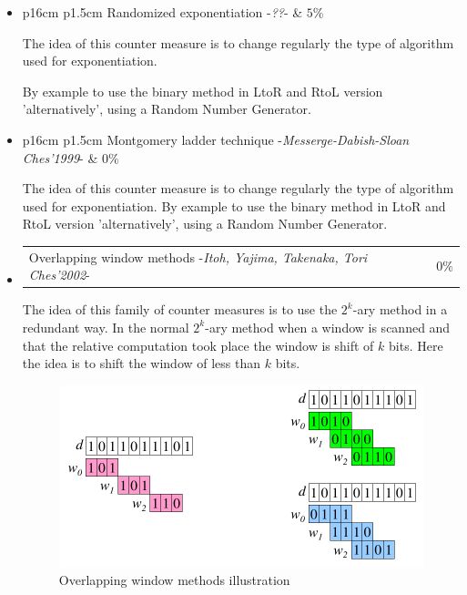 \begin{itemize}
\item	\begin{tabularx}{\linewidth}{ p{16cm} p{1.5cm}}
			Randomized exponentiation -\textit{??}-  & $5\%$ \\ 
			\end{tabularx}	
			\noindent
The idea of this counter measure is to change regularly the type of algorithm 
used for exponentiation.

By example to use the binary method in LtoR and RtoL 
version 'alternatively', using a Random Number Generator.



\item	\begin{tabularx}{\linewidth}{ p{16cm} p{1.5cm}}
			Montgomery ladder technique -\textit{Messerge-Dabish-Sloan Ches'1999}-  & $0\%$ \\ 
			\end{tabularx}	
			\noindent
The idea of this counter measure is to change regularly the type of algorithm used for exponentiation.
By example to use the binary method in LtoR and RtoL version 'alternatively', using a Random Number Generator.



\item \begin{tabularx}{\linewidth}{ p{16cm} p{1.5cm}}
			Overlapping window methods -\textit{Itoh, Yajima, Takenaka, Tori Ches'2002}-  & $0\%$ \\ 
			\end{tabularx}	
			\noindent
The idea of this family of counter measures is to use the $2^k$-ary method in a redundant way.
In the normal $2^k$-ary method when a window is scanned and that the relative computation took place
the window is shift of $k$ bits. Here the idea is to shift the window of less than $k$ bits.\\
			\begin{figure}[h]
				\begin{center}
	        	\includegraphics[scale=0.30]{images/Over.png}
				\caption{Overlapping window methods illustration}
				\end{center}
			\end{figure}


\end{itemize}
